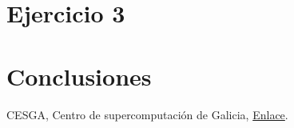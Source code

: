 \documentclass{article}
\begin{document}
\section{Ejercicio 3}


\section{Conclusiones}


\begin{thebibliography}{9}
	 CESGA, Centro de supercomputación de Galicia, \href{https://www.cesga.es/}{Enlace}.
\end{thebibliography}
\end{document}
